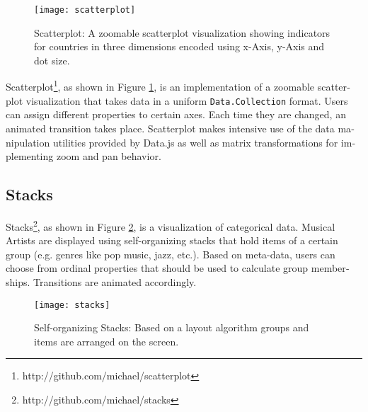 \begin{english}
\begin{figure}
\centering
\texttt{[image: scatterplot]}
\caption{Scatterplot: A zoomable scatterplot visualization showing indicators for countries in three dimensions encoded using x-Axis, y-Axis and dot size.}
\label{fig:scatterplot}
\end{figure}

Scatterplot\footnote{http://github.com/michael/scatterplot}, as shown in Figure \ref{fig:scatterplot}, is an implementation of a zoomable scatterplot visualization that takes data in a uniform \texttt{Data.Collection} format. Users can assign different properties to certain axes. Each time they are changed, an animated transition takes place. Scatterplot makes intensive use of the data manipulation utilities provided by Data.js as well as matrix transformations for implementing zoom and pan behavior.


\subsection{Stacks}

Stacks\footnote{http://github.com/michael/stacks}, as shown in Figure \ref{fig:stacks}, is a visualization of categorical data. Musical Artists are displayed using self-organizing stacks that hold items of a certain group (e.g. genres like pop music, jazz, etc.). Based on meta-data, users can choose from ordinal properties that should be used to calculate group memberships. Transitions are animated accordingly. 

\begin{figure}
\centering
\texttt{[image: stacks]}
\caption{Self-organizing Stacks: Based on a layout algorithm groups and items are arranged on the screen.}
\label{fig:stacks}
\end{figure}

\end{english}